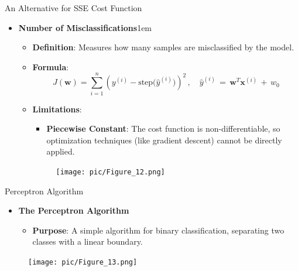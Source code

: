 \documentclass[serif, aspectratio=169]{beamer}
\begin{document}
\begin{frame}{An Alternative for SSE Cost Function}
    \begin{itemize}
        \item \textbf{Number of Misclassifications}\itemsep1em
        \medskip
        \begin{itemize}\itemsep0.8em
            \item \textbf{Definition}:
            Measures how many samples are misclassified by the model.
            \item \textbf{Formula}:
                \[
                J(\mathbf{w}) = \sum_{i=1}^{n} (y^{(i)} - \text{step(\(\hat{y}^{(i)})\)})^2 \, , \quad \hat{y}^{(i)} \, = \, \mathbf{w}^T\mathbf{x}^{(i)} \, + \, w_0
                \]
            \item \textbf{Limitations}: \\
            \begin{itemize}
                \item \justifying \textbf{Piecewise Constant}:
                The cost function is non-differentiable, so optimization techniques (like gradient descent) cannot be directly applied.
            \end{itemize}
            \endminipage
            \hspace{1cm}
            \begin{figure}[bh]
                \texttt{[image: pic/Figure\_12.png]}
            \end{figure}
            \endminipage
        \end{itemize}
    \end{itemize}
\end{frame}


\begin{frame}{Perceptron Algorithm}
    \begin{itemize}
        \item \textbf{The Perceptron Algorithm}
        \medskip
        \begin{itemize}\itemsep1em
            \item \justifying \textbf{Purpose}:
            A simple algorithm for binary classification, separating two classes with a linear boundary.
        \end{itemize}
    \end{itemize}
    \begin{figure}
        \centering
        \texttt{[image: pic/Figure\_13.png]}
    \end{figure}
\end{frame}
\end{document}

